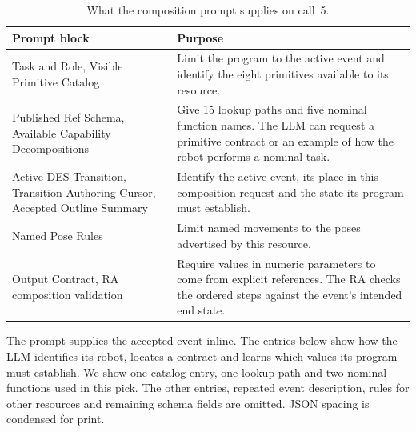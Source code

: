 \documentclass[preprint,12pt,authoryear]{elsarticle}
\begin{document}
\begin{table}[H]\centering\small
\caption{What the composition prompt supplies on call~5.}
\begin{tabularx}{\linewidth}{@{}>{\raggedright\arraybackslash}p{.32\linewidth}Y@{}}
\toprule
Prompt block & Purpose \\
\midrule
Task and Role, Visible Primitive Catalog & Limit the program to the active event and identify the eight primitives available to its resource. \\
Published Ref Schema, Available Capability Decompositions & Give 15 lookup paths and five nominal function names. The LLM can request a primitive contract or an example of how the robot performs a nominal task. \\
Active DES Transition, Transition Authoring Cursor, Accepted Outline Summary & Identify the active event, its place in this composition request and the state its program must establish. \\
Named Pose Rules & Limit named movements to the poses advertised by this resource. \\
Output Contract, RA composition validation & Require values in numeric parameters to come from explicit references. The RA checks the ordered steps against the event's intended end state. \\
\bottomrule
\end{tabularx}
\end{table}

The prompt supplies the accepted event inline. The entries below show how the LLM identifies its robot, locates a contract and learns which values its program must establish. We show one catalog entry, one lookup path and two nominal functions used in this pick. The other entries, repeated event description, rules for other resources and remaining schema fields are omitted. JSON spacing is condensed for print.
\end{document}
